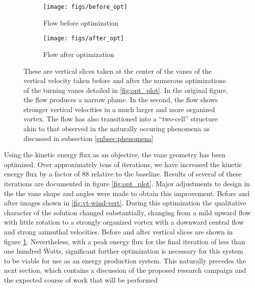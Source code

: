 

%
%
\begin{figure}[htb!]
 \begin{subfigure}{.5\textwidth}
  \centering
  \texttt{[image: figs/before\_opt]}
  \caption{Flow before optimization}
 \end{subfigure}%
 \begin{subfigure}{.5\textwidth}
  \centering
  \texttt{[image: figs/after\_opt]}
  \caption{Flow after optimization}
 \end{subfigure}%
  \caption{These are vertical slices taken at the center of the vanes of
 the vertical velocity taken before and after the numerous optimizations
 of the turning vanes detailed in \ref{fig:opt_plot}. In the
 original figure, the flow produces a narrow plume. In the second, the
 flow shows stronger vertical velocities in a much larger and more
 organized vortex. The flow has also transitioned into a ``two-cell''
 structure akin to that observed in the naturally occuring phenomena as
 discussed in subsection \ref{subsec:phenomena}}
  \label{fig:opt_flow}
\end{figure}
%

Using the kinetic energy flux as an objective, the vane geometry has
been optimized. Over approximately tens of iterations, we have
increased the kinetic energy flux by a factor of 88 relative to the
baseline. Results of several of these iterations are documented in
figure \ref{fig:opt_plot}. Major adjustments to design in the the vane
shape and angles were made to obtain this improvement. Before and after
images shown in \ref{fig:vt-wind-vert}. During this optimization the
qualitative character of the solution changed substantially, changing
from a mild upward flow with little rotation to a strongly organized
vortex with a downward central flow and strong azimuthal
velocities. Before and after vertical slices are shown in figure
\ref{fig:opt_flow}. Nevertheless, with a peak energy flux for the final 
iteration of less than one hundred Watts, significant further
optimization is necessary for this system to be viable for use as an 
energy production system. This naturally precedes the next section,
which contains a discussion of the proposed research campaign and the
expected course of work that will be performed 

